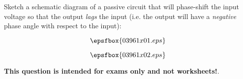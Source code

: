 

Sketch a schematic diagram of a passive circuit that will phase-shift the input voltage so that the output {\it lags} the input (i.e. the output will have a {\it negative} phase angle with respect to the input):

$$\epsfbox{03961x01.eps}$$







$$\epsfbox{03961x02.eps}$$







{\bf This question is intended for exams only and not worksheets!}.



